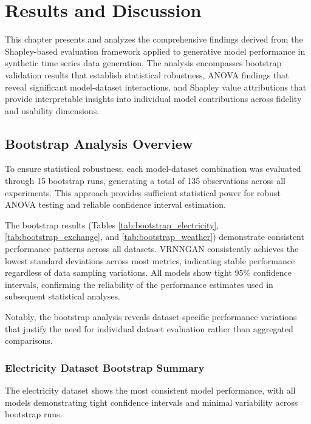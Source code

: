 \documentclass{article}
\begin{document}
\newpage

\section{Results and Discussion}


This chapter presents and analyzes the comprehensive findings derived from the Shapley-based evaluation framework applied to generative model performance in synthetic time series data generation. The analysis encompasses bootstrap validation results that establish statistical robustness, ANOVA findings that reveal significant model-dataset interactions, and Shapley value attributions that provide interpretable insights into individual model contributions across fidelity and usability dimensions.

\subsection{Bootstrap Analysis Overview}
To ensure statistical robustness, each model-dataset combination was evaluated through 15 bootstrap runs, generating a total of 135 observations across all experiments. This approach provides sufficient statistical power for robust ANOVA testing and reliable confidence interval estimation.

The bootstrap results (Tables \ref{tab:bootstrap_electricity}, \ref{tab:bootstrap_exchange}, and \ref{tab:bootstrap_weather}) demonstrate consistent performance patterns across all datasets. VRNNGAN consistently achieves the lowest standard deviations across most metrics, indicating stable performance regardless of data sampling variations. All models show tight 95\% confidence intervals, confirming the reliability of the performance estimates used in subsequent statistical analyses.

Notably, the bootstrap analysis reveals dataset-specific performance variations that justify the need for individual dataset evaluation rather than aggregated comparisons.
\subsubsection{Electricity Dataset Bootstrap Summary}
The electricity dataset shows the most consistent model performance, with all models demonstrating tight confidence intervals and minimal variability across bootstrap runs.
\end{document}

